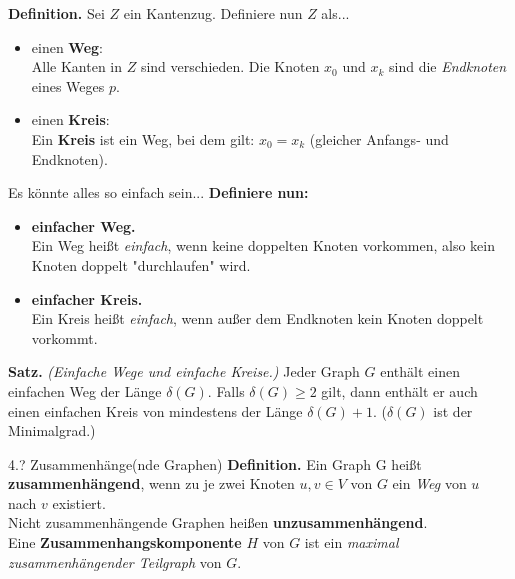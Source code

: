\documentclass{beamer}
\begin{document}
\begin{frame}
    \textbf{Definition.}
    Sei \(Z\) ein Kantenzug. Definiere nun \(Z\) als...
    \begin{itemize}
        \item einen \textbf{Weg}: \\
        Alle Kanten in \(Z\) sind verschieden. Die Knoten \(x_0\) und \(x_k\) sind die \textit{Endknoten} eines Weges \(p\). 
        \item einen \textbf{Kreis}: \\
        Ein \textbf{Kreis} ist ein Weg, bei dem gilt: \(x_0 = x_k\) (gleicher Anfangs- und Endknoten).
    \end{itemize}
\end{frame}

\begin{frame}{Es könnte alles so einfach sein...}
    \textbf{Definiere nun:}\\
    \begin{itemize}
        \item \textbf{einfacher Weg.}\\
        Ein Weg heißt \textit{einfach}, wenn keine doppelten Knoten vorkommen, also kein Knoten doppelt "durchlaufen" wird.
        \item \textbf{einfacher Kreis.}\\
        Ein Kreis heißt \textit{einfach}, wenn außer dem Endknoten kein Knoten doppelt vorkommt. 
    \end{itemize}
\end{frame}

\begin{frame}
    \textbf{Satz.} \textit{(Einfache Wege und einfache Kreise.)} Jeder Graph \(G\) enthält einen einfachen Weg der Länge \(\delta(G)\). Falls \(\delta(G) \geq 2\) gilt, dann enthält er auch einen einfachen Kreis von mindestens der Länge \(\delta(G) + 1\). (\(\delta(G)\) ist der Minimalgrad.)
\end{frame}

\begin{frame}{4.? Zusammenhänge(nde Graphen)}
    \textbf{Definition.} Ein Graph G heißt \textbf{zusammenhängend}, wenn zu je zwei Knoten \(u, v \in V\) von \(G\) ein \textit{Weg} von \(u\) nach \(v\) existiert.\\
    Nicht zusammenhängende Graphen heißen \textbf{unzusammenhängend}.\\
    Eine \textbf{Zusammenhangskomponente} \(H\) von \(G\) ist ein \textit{maximal zusammenhängender Teilgraph} von \(G\). 
    
\end{frame}
\end{document}
